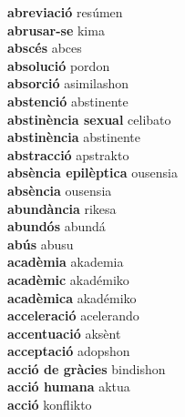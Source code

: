 \textbf{ abreviació  } resúmen \\
\textbf{ abrusar-se  } kima \\
\textbf{ abscés  } abces \\
\textbf{ absolució  } pordon \\
\textbf{ absorció  } asimilashon \\
\textbf{ abstenció  } abstinente \\
\textbf{ abstinència sexual  } celibato \\
\textbf{ abstinència  } abstinente \\
\textbf{ abstracció  } apstrakto \\
\textbf{ absència epilèptica  } ousensia \\
\textbf{ absència  } ousensia \\
\textbf{ abundància  } rikesa \\
\textbf{ abundós  } abundá \\
\textbf{ abús  } abusu \\
\textbf{ acadèmia  } akademia \\
\textbf{ acadèmic  } akadémiko \\
\textbf{ acadèmica  } akadémiko \\
\textbf{ acceleració  } acelerando \\
\textbf{ accentuació  } aksènt \\
\textbf{ acceptació  } adopshon \\
\textbf{ acció de gràcies  } bindishon \\
\textbf{ acció humana  } aktua \\
\textbf{ acció  } konflikto \\
